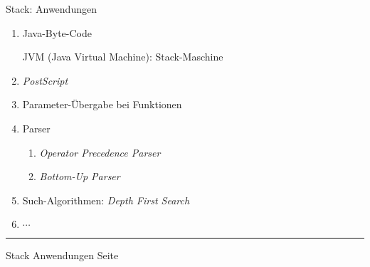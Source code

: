 \documentclass{slides}
\newcounter{mypage}
\begin{document}

\begin{slide}{}
\begin{center}
Stack: Anwendungen
\end{center}

\begin{enumerate}
\item Java-Byte-Code

      JVM (Java Virtual Machine): Stack-Maschine
\item \textsl{PostScript}
\item Parameter-Übergabe bei Funktionen
\item Parser
      \begin{enumerate}
      \item \textsl{Operator Precedence Parser}
      \item \textsl{Bottom-Up Parser}
      \end{enumerate}
\item Such-Algorithmen: \textsl{Depth First Search}
\item $\cdots$
\end{enumerate}

\vspace*{\fill}
\tiny \addtocounter{mypage}{1}
\rule{17cm}{1mm}
Stack Anwendungen  \hspace*{\fill} Seite 
\end{slide}

\end{document}
